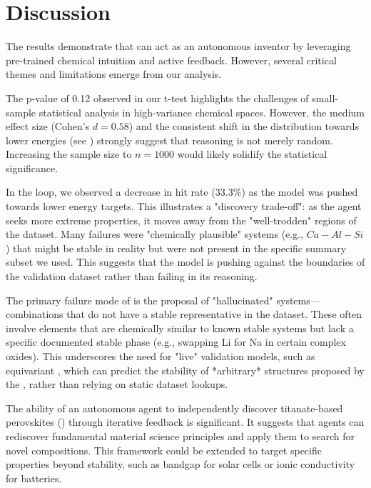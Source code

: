 \section{Discussion}
\label{sec:discussion}

The results demonstrate that \ours can act as an autonomous inventor by leveraging pre-trained chemical intuition and active feedback. However, several critical themes and limitations emerge from our analysis.

The p-value of 0.12 observed in our t-test highlights the challenges of small-sample statistical analysis in high-variance chemical spaces. However, the medium effect size (Cohen's $d = 0.58$) and the consistent shift in the distribution towards lower energies (see ) strongly suggest that \llm reasoning is not merely random. Increasing the sample size to $n=1000$ would likely solidify the statistical significance.

In the \activelearning loop, we observed a decrease in hit rate (33.3\%) as the model was pushed towards lower energy targets. This illustrates a "discovery trade-off": as the agent seeks more extreme properties, it moves away from the "well-trodden" regions of the dataset. Many failures were "chemically plausible" systems (e.g., $Ca-Al-Si$) that might be stable in reality but were not present in the specific \gnome summary subset we used. This suggests that the model is pushing against the boundaries of the validation dataset rather than failing in its reasoning.

The primary failure mode of \ours is the proposal of "hallucinated" systems—combinations that do not have a stable representative in the dataset. These often involve elements that are chemically similar to known stable systems but lack a specific documented stable phase (e.g., swapping Li for Na in certain complex oxides). This underscores the need for "live" validation models, such as equivariant \gnns, which can predict the stability of *arbitrary* structures proposed by the \llm, rather than relying on static dataset lookups.

The ability of an autonomous agent to independently discover titanate-based perovskites () through iterative feedback is significant. It suggests that \llm agents can rediscover fundamental material science principles and apply them to search for novel compositions. This framework could be extended to target specific properties beyond stability, such as bandgap for solar cells or ionic conductivity for batteries.
